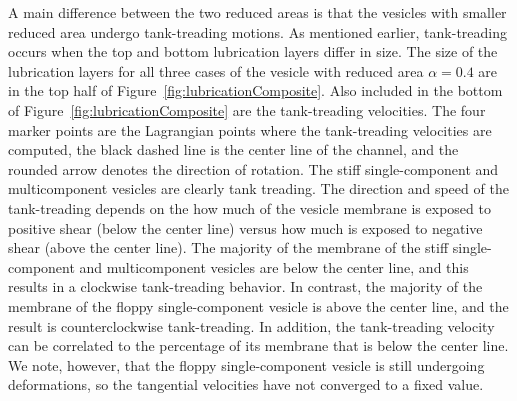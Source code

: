 \documentclass[twoside,twocolumn,9pt]{article}
\begin{document}
A main difference between the two reduced areas is that the vesicles
with smaller reduced area undergo tank-treading motions. As mentioned
earlier, tank-treading occurs when the top and bottom lubrication layers
differ in size. The size of the lubrication layers for all three cases
of the vesicle with reduced area $\alpha = 0.4$ are in the top half of
Figure~\ref{fig:lubricationComposite}. Also included in the bottom of
Figure~\ref{fig:lubricationComposite} are the tank-treading velocities.
The four marker points are the Lagrangian points where the tank-treading
velocities are computed, the black dashed line is the center line of the
channel, and the rounded arrow denotes the direction of rotation. The
stiff single-component and multicomponent vesicles are clearly tank
treading. The direction and speed of the tank-treading depends on the
how much of the vesicle membrane is exposed to positive shear (below the
center line) versus how much is exposed to negative shear (above the
center line). The majority of the membrane of the stiff single-component
and multicomponent vesicles are below the center line, and this results
in a clockwise tank-treading behavior. In contrast, the majority of the
membrane of the floppy single-component vesicle is above the center
line, and the result is counterclockwise tank-treading. In addition, the
tank-treading velocity can be correlated to the percentage of its
membrane that is below the center line. We note, however, that the
floppy single-component vesicle is still undergoing deformations, so the
tangential velocities have not converged to a fixed value.



\end{document}
